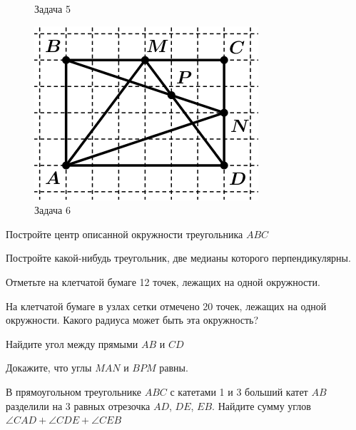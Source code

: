 \documentclass{article}
\begin{document}
\begin{figure}[h]
\begin{center}
\begin{minipage}[h]{0.3\linewidth}
                \caption{Задача 5} %
                \label{ris:5} %
            \end{minipage}
            \hfill
            \begin{minipage}[h]{0.3\linewidth}
                \includegraphics[width=1\linewidth]{6}
                \caption{Задача 6} %
                \label{ris:6} %
            \end{minipage}
        \end{center}
    \end{figure}

    \begin{enumerate_boxed}

        \item Постройте центр описанной окружности треугольника $ABC$

        \item Постройте какой-нибудь треугольник, две медианы которого перпендикулярны.

        \item Отметьте на клетчатой бумаге 12 точек, лежащих на одной окружности.

        \item На клетчатой бумаге в узлах сетки отмечено 20 точек, лежащих на одной окружности.
        Какого радиуса может быть эта окружность?

        \item Найдите угол между прямыми $AB$ и $CD$

        \item Докажите, что углы $MAN$ и $BPM$ равны.

        \item В прямоугольном треугольнике $ABC$ с катетами 1 и 3 больший катет $AB$ разделили на 3 равных отрезочка $AD$, $DE$, $EB$.
        Найдите сумму углов $\angle CAD + \angle CDE + \angle CEB$

    \end{enumerate_boxed}
\end{document}
